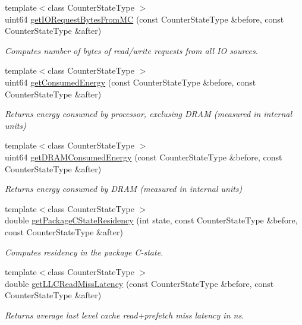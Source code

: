 \begin{DoxyCompactItemize}
{\footnotesize template$<$class Counter\+State\+Type $>$ }\\uint64 \mbox{\hyperlink{class_uncore_counter_state_a7e5434dba3a810501f289329e52b889d}{get\+I\+O\+Request\+Bytes\+From\+MC}} (const Counter\+State\+Type \&before, const Counter\+State\+Type \&after)
\begin{DoxyCompactList}\small\item\em Computes number of bytes of read/write requests from all IO sources. \end{DoxyCompactList}\item 
{\footnotesize template$<$class Counter\+State\+Type $>$ }\\uint64 \mbox{\hyperlink{class_uncore_counter_state_a054b949f09283093e1923affa4e58ae8}{get\+Consumed\+Energy}} (const Counter\+State\+Type \&before, const Counter\+State\+Type \&after)
\begin{DoxyCompactList}\small\item\em Returns energy consumed by processor, exclusing D\+R\+AM (measured in internal units) \end{DoxyCompactList}\item 
{\footnotesize template$<$class Counter\+State\+Type $>$ }\\uint64 \mbox{\hyperlink{class_uncore_counter_state_a71af0766460ef7dd3d138ec0d0924eda}{get\+D\+R\+A\+M\+Consumed\+Energy}} (const Counter\+State\+Type \&before, const Counter\+State\+Type \&after)
\begin{DoxyCompactList}\small\item\em Returns energy consumed by D\+R\+AM (measured in internal units) \end{DoxyCompactList}\item 
{\footnotesize template$<$class Counter\+State\+Type $>$ }\\double \mbox{\hyperlink{class_uncore_counter_state_a5e34f7b0326dda86b54fcb7bb84a0b38}{get\+Package\+C\+State\+Residency}} (int state, const Counter\+State\+Type \&before, const Counter\+State\+Type \&after)
\begin{DoxyCompactList}\small\item\em Computes residency in the package C-\/state. \end{DoxyCompactList}\item 
\mbox{\label{class_uncore_counter_state_a6791e3fe842320171cbac393e55929f6}} 
{\footnotesize template$<$class Counter\+State\+Type $>$ }\\double \mbox{\hyperlink{class_uncore_counter_state_a6791e3fe842320171cbac393e55929f6}{get\+L\+L\+C\+Read\+Miss\+Latency}} (const Counter\+State\+Type \&before, const Counter\+State\+Type \&after)
\begin{DoxyCompactList}\small\item\em Returns average last level cache read+prefetch miss latency in ns. \end{DoxyCompactList}\end{DoxyCompactItemize}


